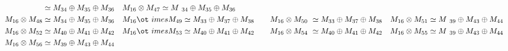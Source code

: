 \begin{align*}
{} \simeq M_{34} \oplus M_{35} \oplus M_{36} &&& M_{16} \otimes M_{47} \simeq M\
_{34} \oplus M_{35} \oplus M_{36}\\
M_{16} \otimes M_{48} \simeq M_{34} \oplus M_{35} \oplus M_{36} &&& M_{16} \ot\
imes M_{49} \simeq M_{33} \oplus M_{37} \oplus M_{38} &&& M_{16} \otimes M_{50\
} \simeq M_{33} \oplus M_{37} \oplus M_{38} &&& M_{16} \otimes M_{51} \simeq M\
_{39} \oplus M_{43} \oplus M_{44}\\
M_{16} \otimes M_{52} \simeq M_{40} \oplus M_{41} \oplus M_{42} &&& M_{16} \ot\
imes M_{53} \simeq M_{40} \oplus M_{41} \oplus M_{42} &&& M_{16} \otimes M_{54\
} \simeq M_{40} \oplus M_{41} \oplus M_{42} &&& M_{16} \otimes M_{55} \simeq M\
_{39} \oplus M_{43} \oplus M_{44}\\
M_{16} \otimes M_{56} \simeq M_{39} \oplus M_{43} \oplus M_{44}\\
\end{align*}

